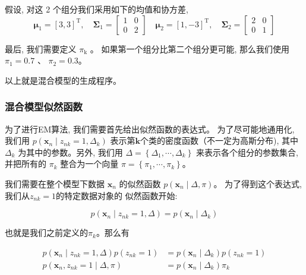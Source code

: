 \documentclass[UTF8]{ctexart}
\begin{document}
假设, 对这 2 个组分我们采用如下的均值和协方差,
\begin{equation}
\boldsymbol{\mu}_{1}=[3,3]^{\mathrm{T}}, \quad \boldsymbol{\Sigma}_{1}=\left[\begin{array}{ll}
1 & 0 \\
0 & 2
\end{array}\right] \quad \boldsymbol{\mu}_{2}=[1,-3]^{\mathrm{T}}, \quad \boldsymbol{\Sigma}_{2}=\left[\begin{array}{ll}
2 & 0 \\
0 & 1
\end{array}\right]
\end{equation}

最后, 我们需要定义 $\pi_{\mathrm{k}}$ 。
如果第一个组分比第二个组分更可能, 
那么我们使用 $\pi_{1}=0.7$ 、 $\pi_{2}=0.3$。 

以上就是混合模型的生成程序。

\subsubsection{混合模型似然函数}
为了进行EM算法, 我们需要首先给出似然函数的表达式。
为了尽可能地通用化, 我们用
$p\left(\boldsymbol{x}_{n} \mid z_{n k}=1, \Delta_{k}\right)$ 
表示第$\boldsymbol{k}$个类的密度函数（不一定为高斯分布), 
其中 $\Delta_{k}$ 为其中的参数。另外, 我们用 
$\Delta=\left\{\Delta_{1}, \cdots, \Delta_{k}\right\}$ 
来表示各个组分的参数集合, 并把所有的 $\pi_{k}$ 整合为一个向量 
$\pi=\left\{\pi_{1}, \cdots, \pi_{k}\right\}$。

我们需要在整个模型下数据 $\boldsymbol{x}_{n}$ 的似然函数
$p\left(\boldsymbol{x}_{n} \mid \Delta, \pi\right)$。
为了得到这个表达式, 我们从$z_{n k}=1$的特定数据对象的
似然函数开始:

\begin{equation}
p\left(\boldsymbol{x}_{n} \mid z_{n k}=1, \Delta\right)=p\left(\boldsymbol{x}_{n} \mid \Delta_{k}\right) 
\end{equation}

也就是我们之前定义的$\pi_{k}$。那么有

$$
\begin{aligned}
p\left(\boldsymbol{x}_{n} \mid z_{n k}=1, \Delta\right) p\left(z_{n k}=1\right)&=p\left(\boldsymbol{x}_{n} \mid \Delta_{k}\right) p\left(z_{n k}=1\right) \\
p\left(\boldsymbol{x}_{n}, z_{n k}=1 \mid \Delta, \pi\right)&=p\left(\boldsymbol{x}_{n} \mid \Delta_{k}\right) \pi_{k}
\end{aligned}
$$
\end{document}
